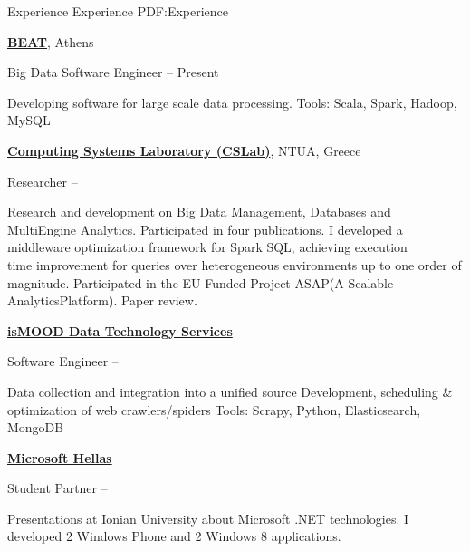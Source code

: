 
\Section
{Experience}
{Experience}
{PDF:Experience}

\Entry
\href{http://taxibeat.gr}
{\textbf{BEAT}}, Athens

\Gap
\BulletItem
Big Data Software Engineer
\hfill
{} --
Present
\begin{Detail}
	\SubBulletItem
	Developing software for large scale data processing.
	\SubBulletItem
	Tools: Scala, Spark, Hadoop, MySQL
	
	
\end{Detail}

\Entry
\href{http://cslab.ece.ntua.gr}
{\textbf{Computing Systems Laboratory (CSLab)}},
NTUA, Greece

\Gap
\BulletItem
Researcher
\hfill
{} --
\begin{Detail}
	\SubBulletItem
	Research and development on Big Data Management, Databases and\\ MultiEngine
	Analytics. Participated in four publications.
	\SubBulletItem
	I developed a middleware optimization framework for Spark SQL, achieving
	execution\\ time improvement for queries over heterogeneous environments up to one order of magnitude.
	\SubBulletItem
	Participated in the EU Funded Project ASAP(A Scalable AnalyticsPlatform).
	\SubBulletItem
	Paper review.
\end{Detail}

\Entry
\href{http://ismood.gr}
{\textbf{isMOOD Data Technology Services}}

\Gap
\BulletItem
Software Engineer
\hfill
{} --
\begin{Detail}
	\SubBulletItem
	Data collection and integration into a unified source
	\SubBulletItem
	Development, scheduling \& optimization of web crawlers/spiders
	\SubBulletItem
	Tools: Scrapy, Python, Elasticsearch, MongoDB
\end{Detail}

\Entry
\href{http://microsoft.gr}
{\textbf{Microsoft Hellas}}

\Gap
\BulletItem
Student Partner
\hfill
{} --
\begin{Detail}
	\SubBulletItem
	Presentations at Ionian University about Microsoft .NET technologies.
	\SubBulletItem
	I developed 2 Windows Phone and 2 Windows 8 applications.
\end{Detail}